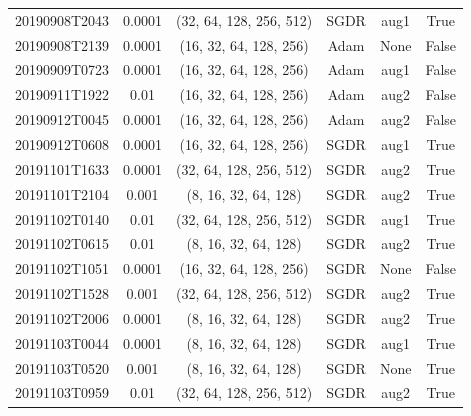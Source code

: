 \begin{table}[!ht]
\begin{adjustbox}{width=\columnwidth, center}
\begin{tabular}{cccccc}
			20190908T2043 &       0.0001 &  (32, 64, 128, 256, 512) &      SGDR &                  aug1 &                  True \\
			20190908T2139 &       0.0001 &   (16, 32, 64, 128, 256) &      Adam &                  None &                   False \\
			20190909T0723 &       0.0001 &   (16, 32, 64, 128, 256) &      Adam &                  aug1 &                   False \\
			20190911T1922 &         0.01 &   (16, 32, 64, 128, 256) &      Adam &                  aug2 &                   False \\
			20190912T0045 &       0.0001 &   (16, 32, 64, 128, 256) &      Adam &                  aug2 &                   False \\
			20190912T0608 &       0.0001 &   (16, 32, 64, 128, 256) &      SGDR &                  aug1 &                  True \\
			20191101T1633 &       0.0001 &  (32, 64, 128, 256, 512) &      SGDR &                  aug2 &                  True \\
			20191101T2104 &        0.001 &     (8, 16, 32, 64, 128) &      SGDR &                  aug2 &                  True \\
			20191102T0140 &         0.01 &  (32, 64, 128, 256, 512) &      SGDR &                  aug1 &                  True \\
			20191102T0615 &         0.01 &     (8, 16, 32, 64, 128) &      SGDR &                  aug2 &                  True \\
			20191102T1051 &       0.0001 &   (16, 32, 64, 128, 256) &      SGDR &                  None &                  False \\
			20191102T1528 &        0.001 &  (32, 64, 128, 256, 512) &      SGDR &                  aug2 &                  True \\
			20191102T2006 &       0.0001 &     (8, 16, 32, 64, 128) &      SGDR &                  aug2 &                  True \\
			20191103T0044 &       0.0001 &     (8, 16, 32, 64, 128) &      SGDR &                  aug1 &                  True \\
			20191103T0520 &        0.001 &     (8, 16, 32, 64, 128) &      SGDR &                  None &                  True \\
			20191103T0959 &         0.01 &  (32, 64, 128, 256, 512) &      SGDR &                  aug2 &                  True \\

\end{tabular}
\end{adjustbox}
\end{table}

